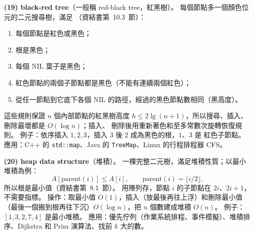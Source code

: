\begin{pastsoln}
\textbf{(19) black-red tree}（一般稱 red-black tree，紅黑樹）。 每個節點多一個顏色位元的二元搜尋樹，滿足
（資結書第~10.3~節）：
\begin{enumerate}
\item 每個節點是紅色或黑色；
\item 根是黑色；
\item 每個 NIL 葉子是黑色；
\item 紅色節點的兩個子節點都是黑色（不能有連續兩個紅色）；
\item 從任一節點到它底下各個 NIL 的路徑，經過的黑色節點數相同（黑高度）。
\end{enumerate}
這些規則保證 $n$ 個內部節點的紅黑樹高度 $h \le 2\lg(n + 1)$，所以搜尋、插入、刪除最壞都是 $O(\log n)$；插入、
刪除後用重新著色和至多常數次旋轉恢復規則。 例子：依序插入 $1, 2, 3$，插入 $3$ 後 $2$ 成為黑色的根，$1$、$3$ 是
紅色子節點。 應用：C++ 的 \texttt{std::map}、Java 的 \texttt{TreeMap}、Linux 的行程排程器 CFS。

\textbf{(20) heap data structure}（堆積）。 一棵完整二元樹，滿足堆積性質；以最小堆積為例：
\[
A[\mathrm{parent}(i)] \le A[i],\qquad \mathrm{parent}(i) = \lfloor i/2\rfloor,
\]
所以根是最小值（資結書第~8.1~節）。 用陣列存，節點 $i$ 的子節點在 $2i$、$2i + 1$，不需要指標。 操作：取最小值
$O(1)$，插入（放最後再往上浮）和刪除最小值（最後一個搬到根再往下沉）$O(\log n)$，把 $n$ 個數建成堆積 $O(n)$。
例子：$[1, 3, 2, 7, 4]$ 是最小堆積。 應用：優先佇列（作業系統排程、事件模擬）、堆積排序、Dijkstra 和 Prim
演算法、找前 $k$ 大的數。
\end{pastsoln}
